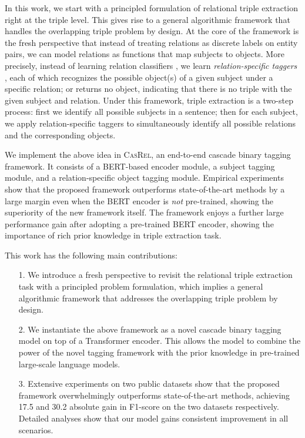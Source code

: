 \documentclass[11pt,a4paper]{article}
\begin{document}
\par In this work, we start with a principled formulation of relational triple extraction {right at the triple level}. This gives rise to a general algorithmic framework that handles the overlapping triple problem {by design}. At the core of the framework is the fresh perspective that instead of treating relations as discrete labels on entity pairs, we can model relations as functions that map subjects to objects. More precisely, instead of learning relation classifiers , we learn \emph{relation-specific taggers} , each of which recognizes the possible object(s) of a given subject under a specific relation; or returns no object, indicating that there is no triple with the given subject and relation. Under this framework, triple extraction is a two-step process: first we identify all possible subjects in a sentence; then for each subject, we apply relation-specific taggers to simultaneously identify all possible relations and the corresponding objects.

\par We implement the above idea in \textsc{CasRel}, an end-to-end cascade binary tagging framework. It consists of a BERT-based encoder module, a subject tagging module, and a relation-specific object tagging module. Empirical experiments show that the proposed framework outperforms state-of-the-art methods by a large margin even when the BERT encoder is \emph{not} pre-trained, showing the superiority of the new framework itself. The framework enjoys a further large performance gain after adopting a pre-trained BERT encoder, showing the importance of rich prior knowledge in triple extraction task.

\par This work has the following main contributions:
\begin{itemize}
	\item [1.] We introduce a fresh perspective to revisit the relational triple extraction task with a principled problem formulation, which implies a general algorithmic framework that addresses the overlapping triple problem by design.
	\item [2.] We instantiate the above framework as a novel cascade binary tagging model on top of a Transformer encoder. This allows the model to combine the power of the novel tagging framework with the prior knowledge in pre-trained large-scale language models.
	\item [3.] Extensive experiments on two public datasets show that the proposed framework overwhelmingly outperforms state-of-the-art methods, achieving 17.5 and 30.2 absolute gain in F1-score on the two datasets respectively. Detailed analyses show that our model gains consistent improvement in all scenarios.
\end{itemize}
\end{document}
